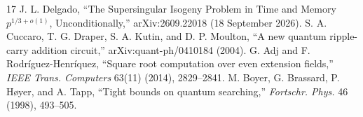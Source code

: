\documentclass[10pt,a4paper]{article}
\begin{document}
\begin{thebibliography}{17}
 J. L. Delgado, ``The Supersingular Isogeny Problem in Time and Memory $p^{1/3+o(1)}$, Unconditionally,'' arXiv:2609.22018 (18 September 2026).
 S. A. Cuccaro, T. G. Draper, S. A. Kutin, and D. P. Moulton, ``A new quantum ripple-carry addition circuit,'' arXiv:quant-ph/0410184 (2004).
 G. Adj and F. Rodr\'iguez-Henr\'iquez, ``Square root computation over even extension fields,'' \emph{IEEE Trans. Computers} 63(11) (2014), 2829--2841.
 M. Boyer, G. Brassard, P. H{\o}yer, and A. Tapp, ``Tight bounds on quantum searching,'' \emph{Fortschr. Phys.} 46 (1998), 493--505.
\end{thebibliography}
\end{document}
